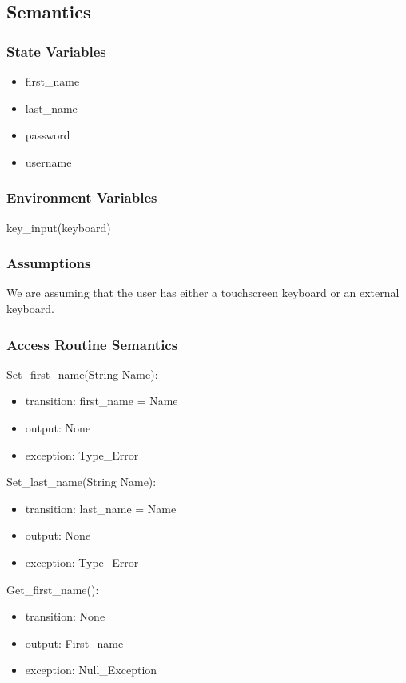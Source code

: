 \documentclass[12pt, titlepage]{article}
\begin{document}
\subsection{Semantics}

\subsubsection{State Variables}

\begin{itemize}
  \item first\_name
  \item last\_name
  \item password
  \item username
\end{itemize}


\subsubsection{Environment Variables}

key\_input(keyboard)

\subsubsection{Assumptions}

We are assuming that the user has either a touchscreen keyboard or an external keyboard.

\subsubsection{Access Routine Semantics}

\noindent Set\_first\_name(String Name):
\begin{itemize}
\item transition: first\_name = Name
\item output: None
\item exception: Type\_Error 
\end{itemize}

\noindent Set\_last\_name(String Name):
\begin{itemize}
\item transition: last\_name = Name
\item output: None
\item exception: Type\_Error 
\end{itemize}

\noindent Get\_first\_name():
\begin{itemize}
\item transition: None
\item output: First\_name
\item exception: Null\_Exception 
\end{itemize}
\end{document}
